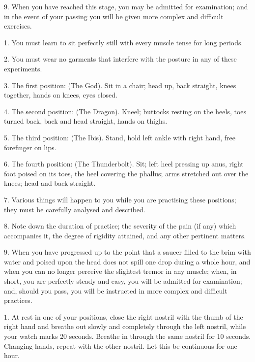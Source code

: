 9. When you have reached this stage, you may be admitted for examination; and in the event of your passing you will be given more complex and difficult exercises.



1. You must learn to sit perfectly still with every muscle tense for long periods.

2. You must wear no garments that interfere with the posture in any of these experiments.

3. The first position: (The God). Sit in a chair; head up, back straight, knees together, hands on knees, eyes closed.

4. The second position: (The Dragon). Kneel; buttocks resting on the heels, toes turned back, back and head straight, hands on thighs.

5. The third position: (The Ibis). Stand, hold left ankle with right hand, free forefinger on lips.

6. The fourth position: (The Thunderbolt). Sit; left heel pressing up anus, right foot poised on its toes, the heel covering the phallus; arms stretched out over the knees; head and back straight.

7. Various things will happen to you while you are practising these positions; they must be carefully analysed and described.

8. Note down the duration of practice; the severity of the pain (if any) which accompanies it, the degree of rigidity attained, and any other pertinent matters.

9. When you have progressed up to the point that a saucer filled to the brim with water and poised upon the head does not spill one drop during a whole hour, and when you can no longer perceive the slightest tremor in any muscle; when, in short, you are perfectly steady and easy, you will be admitted for examination; and, should you pass, you will be instructed in more complex and difficult practices.



1. At rest in one of your positions, close the right nostril with the thumb of the right hand and breathe out slowly and completely through the left nostril, while your watch marks 20 seconds. Breathe in through the same nostril for 10 seconds. Changing hands, repeat with the other nostril. Let this be continuous for one hour.

